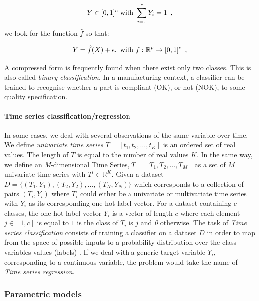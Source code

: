 \begin{equation}
    Y \in [0, 1]^{c} \textnormal{ with } \sum_{i=1}^{c} Y_{i} = 1
    \enspace,
\end{equation}
we look for the function $\hat{f}$ so that:

\begin{equation}
  Y=\hat{f}(X)+ \epsilon, \textnormal{ with } f:\mathbb{R}^{p} \rightarrow [0,1]^{c}
  \enspace,
\end{equation}

A compressed form is frequently found when there exist only two classes. This is also called \textit{binary classification}. In a manufacturing context, a classifier can be trained to recognise whether a part is compliant (OK), or not (NOK), to some quality specification.   

\paragraph{Time series classification/regression}

In some cases, we deal with several observations of the same variable over time. We define \textit{univariate time series} $T = [t_{1}, t_{2}, \dots, t_{K}]$ is an ordered set of real values. The length of $T$ is equal to the number of real values $K$. In the same way, we define an \textit{M}-dimensional Time Series, $T = [T_{1}, T_{2}, \dots, T_{M}]$ as a set of $M$ univariate time series with $T^{i} \in \mathbb{R}^{K}$. Given a dataset $D = \{(T_{1}, Y_{1}),(T_{2}, Y_{2}),\dots,(T_{N}, Y_{N})\}$ which corresponds to a collection of pairs $(T_{i}, Y_{i})$ where $T_i$ could either be a univariate or multivariate time series with $Y_{i}$ as its corresponding one-hot label vector. For a dataset containing $c$ classes, the one-hot label vector $Y_{i}$ is a vector of length $c$ where each element $j \in [1, c]$ is equal to $1$ is the class of $T_{i}$  is $j$ and \textit{0} otherwise. The task of \textit{Time series classification} consists of training a classifier on a dataset $D$ in order to map from the space of possible inputs to a probability distribution over the class variables values (labels) \citep{fawaz2019deep}. If we deal with a generic target variable $Y_{i}$, corresponding to a continuous variable, the problem would take the name of \textit{Time series regression}. 


\subsubsection{Parametric models} \label{Parametric models}

